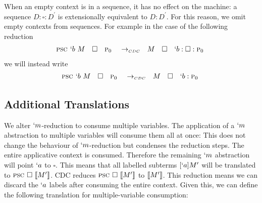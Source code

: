 When an empty context is in a sequence, it has no effect on the machine:
a sequence $D:\square:D^\prime$ is extensionally equivalent to $D:D^\prime$.
For this reason, we omit empty contexts from sequences.
For example in the case of the following reduction
\[
\begin{array}{lllclll}
  \textsc{psc } `b\ M & \square & \textsc{p$_0$ } & \to_{\scriptscriptstyle{CDC}}& M & \square & `b:\square:\textsc{p$_0$ }
\end{array}
\]
we will instead write
\[
\begin{array}{lllclll}
  \textsc{psc } `b\ M & \square & \textsc{p$_0$ } & \to_{\scriptscriptstyle{CDC}}& M & \square & `b:\textsc{p$_0$ }
\end{array}
\]


\subsection{Additional Translations}
We alter $`m$-reduction to consume multiple variables.
The application of a $`m$ abstraction to multiple variables will consume them all at once:
This does not change the behaviour of $`m$-reduction but condenses the reduction steps.
The entire applicative context is consumed.
Therefore the remaining $`m$ abstraction will point $`a$ to $\square$.
This means that all labelled subterms $[`a]M'$ will be translated to $\textsc{psc } \square\ \llbracket M' \rrbracket$.
CDC reduces $\textsc{psc } \square\ \llbracket M' \rrbracket$ to $\llbracket M' \rrbracket$.
This reduction means we can discard the $`a$ labels after consuming the entire context.
Given this, we can define the following translation for multiple-variable consumption:

